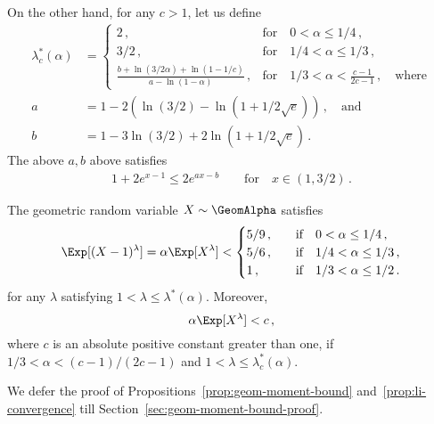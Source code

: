 On the other hand, for any $c > 1$, let us define
\begin{align}\label{eq:lambda-star-c}
    \lambda^*_c(\alpha) &= \begin{cases}
    2\,, & \text{for}\quad 0 < \alpha \leq 1/4 \, ,\\
    3/2\,, & \text{for}\quad 1/4 < \alpha \leq 1/3 \, ,\\
    \frac{b + \ln(3/2\alpha) + \ln(1-1/c)}{a-\ln(1-\alpha)}
        \,, &\text{for}\quad 1/3 < \alpha < \frac{c-1}{2c-1}\,, \quad\text{where}
    \end{cases}\\
        a&= 1 - 2\left( \ln(3/2)-\ln(1+1/2\sqrt{e}) \right)\,,\quad\text{and} \nonumber \\
        b&=1-3\ln(3/2)+2\ln(1+1/2\sqrt{e}) \nonumber \,.
\end{align}
The above $a,b$ above satisfies
\begin{align}\label{eq:lambda-a-b-upperbound}
    1 + 2e^{x-1} \leq 2 e^{a x - b}
    \qquad\text{for}\quad x \in (1, 3/2)
    \, .
\end{align}

\begin{proposition}\label{prop:li-convergence}
The geometric random variable $X \sim \GeomAlpha$ satisfies
\begin{equation}\label{eq:li-convergence}
    \Exp[(X-1)^\lambda] 
    = \alpha \Exp[X^\lambda]
    < \begin{cases}
        5/9\,, &\quad\text{if}\quad 0 < \alpha \leq 1/4\,,\\
        5/6\,, &\quad\text{if}\quad 1/4 < \alpha \leq 1/3\,,\\
        1\,, &\quad\text{if}\quad 1/3 < \alpha \leq 1/2\,.
    \end{cases}
\end{equation}
for any $\lambda$ satisfying $1 < \lambda \leq \lambda^*(\alpha)$.
Moreover, 
\[
    \alpha \Exp[X^\lambda] < c\,, 
\]
where $c$ is an absolute positive constant greater than one, 
if $1/3 < \alpha < (c-1)/(2c-1)$ and $1 < \lambda \leq \lambda_c^*(\alpha)$.
\end{proposition}
We defer the proof of Propositions~\ref{prop:geom-moment-bound} and~\ref{prop:li-convergence} till Section~\ref{sec:geom-moment-bound-proof}.

